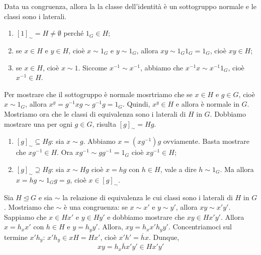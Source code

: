 \documentclass[a4paper]{article}
\begin{document}
\begin{snippetproof}{}
    \begin{iffproof}
        \item Data ua congruenza, allora la la classe dell'identità è un sottogruppo normale
        e le classi sono i laterali.
        \begin{enumerate}
            \item \({[1]}_\sim = H \neq \emptyset\) perché \(1_G \in H\);
            \item se \(x\in H\) e \(y\in H\), cioè \(x\sim 1_G\) e \(y \sim 1_G\), allora
            \(xy \sim 1_G 1_G = 1_G\), cioè \(xy\in H\);
            \item se \(x\in H\), cioè \(x \sim 1\). Siccome \(x^{-1} \sim x^{-1}\),
            abbiamo che \(x^{-1} x \sim x^{-1} 1_G\), cioè \(x^{-1} \in H\).
        \end{enumerate}
        Per mostrare che il sottogruppo è normale mosrtriamo che se \(x\in H\) e \(g\in G\),
        cioè \(x\sim 1_G\), allora \(x^g = g^{-1} x g \sim g^{-1} g = 1_G\). Quindi, \(x^g \in H\)
        e allora è normale in \(G\).
        Mostriamo ora che le classi di equivalenza sono i laterali di \(H\)
        in \(G\). Dobbiamo mostrare una per ogni \(g\in G\), risulta \({[g]}_\sim = Hg\).
        \begin{enumerate}
            \item \({[g]}_\sim \subseteq Hg\): sia \(x\sim g\). Abbiamo
            \(x = (xg^{-1})g\) ovviamente. Basta mostrare che \(xg^{-1} \in H\).
            Ora \(xg^{-1} \sim gg^{-1} = 1_G\) cioè \(xg^{-1} \in H\);
            \item \({[g]}_\sim \supseteq Hg\): sia \(x\sim Hg\) cioè
            \(x = hg\) con \(h \in H\), vale a dire \(h \sim 1_G\).
            Ma allora \(x=hg \sim 1_G g = g\), cioè \(x\in {[g]}_\sim\).
        \end{enumerate}
        \item Sia \(H \unlhd G\) e sia \(\sim\) la relazione di equivalenza
        le cui classi sono i laterali di \(H\) in \(G\).
        Mostriamo che \(\sim\) è una congruenza:
        se \(x\sim x'\) e \(y\sim y'\), allora \(xy\sim x'y'\).
        Sappiamo che \(x\in Hx'\) e \(y \in Hy'\)
        e dobbiamo mostrare che \(xy \in Hx'y'\).
        Allora \(x = h_x x'\) con \(h\in H\) e \(y = h_y y'\).
        Allora, \(xy = h_x x' h_y y'\). Concentriamoci
        sul termine \(x'h_y\): \(x'h_y \in xH = Hx'\),
        cioè \(x'h' = \overline{h} x\). Dunque,
        \[
            xy = h_x \overline{h} x' y' \in Hx'y'
        \]
    \end{iffproof}
\end{snippetproof}
\end{document}

